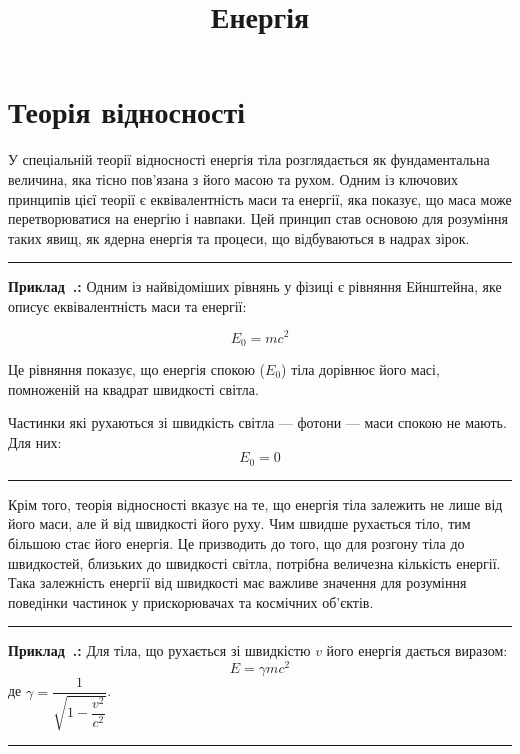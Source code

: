 \documentclass[14pt]{extarticle}
\newcounter{ex}[section]
\newenvironment{Example}[1][]{\refstepcounter{ex}\par\vspace{14pt}\hrule\vspace{6pt}
   \textbf{Приклад~\thesection.\theex: #1} \color{red}\rmfamily
   \setcounter{equation}{0}\renewcommand{\theequation}{\thesection.\theex-\arabic{equation}}}{\color{black}\hrule\rmfamily\vspace{6pt}}
\begin{document}
\title{Енергія}
\date{}
\author{}
\maketitle
\section{Теорія відносності}

У спеціальній теорії відносності енергія тіла розглядається як фундаментальна величина, яка тісно
пов'язана з його масою та рухом. Одним із ключових принципів цієї теорії є еквівалентність маси та
енергії, яка показує, що маса може перетворюватися на енергію і навпаки. Цей принцип став основою для
розуміння таких явищ, як ядерна енергія та процеси, що відбуваються в надрах зірок.

\begin{Example}\label{ex:einstein}
	Одним із найвідоміших рівнянь у фізиці є рівняння Ейнштейна, яке описує еквівалентність маси та
	енергії:

	\begin{equation}\label{eq:einstein}
		E_0 = mc^2
	\end{equation}

	Це рівняння показує, що енергія спокою ($E_0$) тіла дорівнює його масі, помноженій на квадрат
	швидкості світла.

    Частинки які рухаються зі швидкість світла --- фотони --- маси спокою не мають. Для них:
    \begin{equation}
        E_0 = 0
    \end{equation}

\end{Example}

Крім того, теорія відносності вказує на те, що енергія тіла залежить не лише від його маси, але й від
швидкості його руху. Чим швидше рухається тіло, тим більшою стає його енергія. Це призводить до того,
що для розгону тіла до швидкостей, близьких до швидкості світла, потрібна величезна кількість
енергії. Така залежність енергії від швидкості має важливе значення для розуміння поведінки частинок
у прискорювачах та космічних об'єктів.



\begin{Example}\label{ex:einstein2}
	Для тіла, що рухається зі швидкістю $v$ його енергія дається виразом:
	\begin{equation}\label{eq:einstein2}
		E = \gamma mc^2
	\end{equation}
де $\gamma = \dfrac1{\sqrt{1-\dfrac{v^2}{c^2}}}$.
\end{Example}
\end{document}
